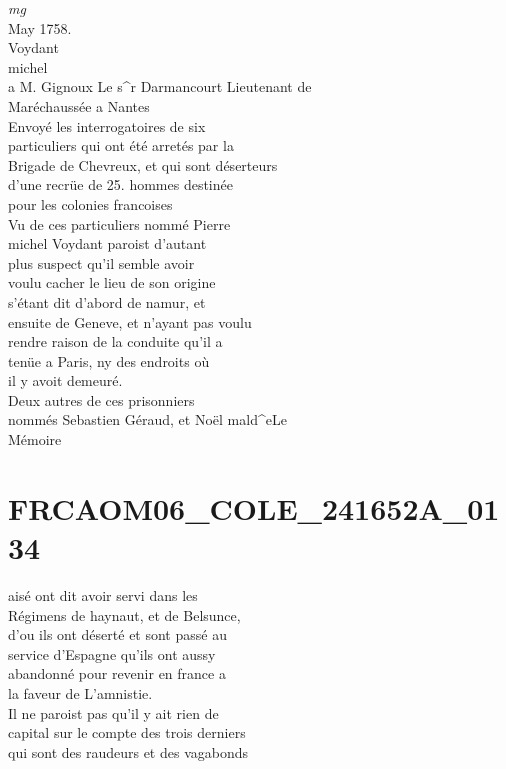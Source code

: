 \documentclass{article}
\begin{document}
\begin{pages}
\vspace{0.5cm}\noindent
\textit{mg}
\footnotesize \\
May 1758.\\
Voydant\\
michel\\
a M. Gignoux
\normalsize \pstart
Le s\^{}r Darmancourt Lieutenant de\\
Maréchaussée a Nantes\\
Envoyé les interrogatoires de six\\
particuliers qui ont été arretés par la\\
Brigade de Chevreux, et qui sont déserteurs\\
d'une recrüe de 25. hommes destinée\\
pour les colonies francoises\\
Vu de ces particuliers nommé Pierre\\
michel Voydant paroist d'autant\\
plus suspect qu'il semble avoir\\
voulu cacher le lieu de son origine\\
s'étant dit d'abord de namur, et\\
ensuite de Geneve, et n'ayant pas voulu\\
rendre raison de la conduite qu'il a\\
tenüe a Paris, ny des endroits où\\
il y avoit demeuré.\\
Deux autres de ces prisonniers\\
nommés Sebastien Géraud, et Noël
\pend\pstart
mald\^{}eLe\\
Mémoire
\pend
\endnumbering\beginnumbering\section{FRCAOM06\_COLE\_241652A\_0134}\pstart
aisé ont dit avoir servi dans les\\
Régimens de haynaut, et de Belsunce,\\
d'ou ils ont déserté et sont passé au\\
service d'Espagne qu'ils ont aussy\\
abandonné pour revenir en france a\\
la faveur de L'amnistie.\\
Il ne paroist pas qu'il y ait rien de\\
capital sur le compte des trois derniers\\
qui sont des raudeurs et des vagabonds\\

\end{pages}
\end{document}
